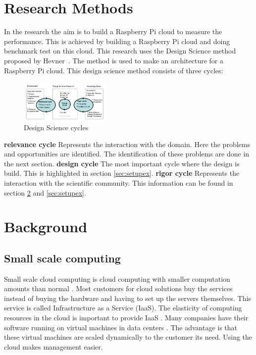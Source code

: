 \documentclass{sig-alternate-br}
\begin{document}
\section{Research Methods}
In the research the  aim is to build a Raspberry Pi cloud to measure the performance. This is achieved by building a Raspberry Pi cloud and doing benchmark test on this cloud. This research uses the Design Science method proposed by Hevner~\cite{hevner:2007}. The method is used to make an architecture for a Raspberry Pi cloud. This design science method consists of three cycles:
\begin{figure}[H]
	\centering 
	\includegraphics[width=0.4\textwidth]{Design_science.png}
	\caption{Design Science cycles \cite{hevner:2007}}
	\label{fig:design} %
\end{figure}
\textbf{relevance cycle} Represents the interaction with the domain. Here the problems and opportunities are identified. The identification of these problems are done in the next section. \newline 
\textbf{design cycle} The most important cycle where the design is build. This is highlighted in section \ref{sec:setupex}. \newline
\textbf{rigor cycle} Represents the interaction with the scientific community. This information can be found in section \ref{sec:back} and \ref{sec:setupex}.



\section{Background}\label{sec:back}
\subsection{Small scale computing}
Small scale cloud computing is cloud computing with smaller computation amounts than normal \cite{cox:2014}. Most customers for cloud solutions buy the services instead of buying the hardware and having to set up the servers themselves. This service is called Infrastructure as a Service (IaaS). The elasticity of computing resources in the cloud is important to provide IaaS \cite{Miettinen:2010:EEM:1863103.1863107}. Many companies have their software running on virtual machines in data centers \cite{beloglazov:2010}. The advantage is that these virtual machines are scaled dynamically to the customer its need. Using the cloud makes  management easier. 
\end{document}
